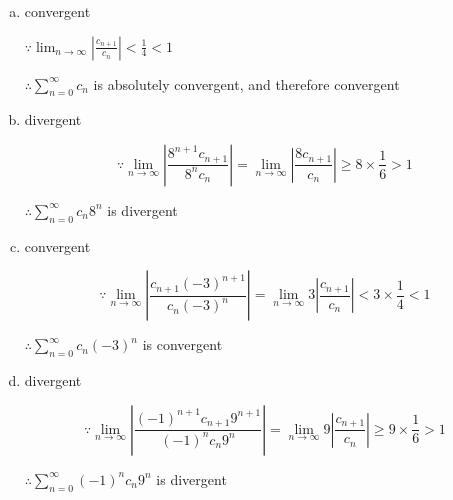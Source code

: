 \documentclass{article}
\begin{document}
    \begin{enumerate}[(a)]
        \item convergent
        
        $\because \lim_{n\to\infty}|\frac{c_{n+1}}{c_n}| < \frac 1 4 < 1$

        $\therefore \sum_{n=0}^\infty c_n$ is absolutely convergent, and therefore convergent

        \item divergent

        $$\because \lim_{n\to\infty}|\frac{8^{n+1}c_{n+1}}{8^nc_n}| = \lim_{n\to\infty}|\frac{8c_{n+1}}{c_n}| \geq 8 \times \frac 1 6 > 1$$

        $\therefore \sum_{n=0}^\infty c_n8^n$ is divergent

        \item convergent

        $$\because \lim_{n\to\infty} | \frac{c_{n+1}(-3)^{n+1}}{c_n(-3)^n} | = \lim_{n\to\infty} 3 | \frac{c_{n+1}}{c_n} | < 3 \times \frac 1 4 < 1$$

        $\therefore \sum_{n=0}^\infty c_n(-3)^n$ is convergent

        \item divergent

        $$\because \lim_{n\to\infty}| \frac{(-1)^{n+1} c_{n+1} 9^{n+1}}{(-1)^{n} c_{n} 9^{n}} | = \lim_{n\to\infty}9 | \frac{c_{n+1}}{c_n} | \geq 9 \times \frac 1 6 > 1$$

        $\therefore \sum_{n=0}^\infty (-1)^n c_n 9^n$ is divergent
    \end{enumerate}
\end{document}
